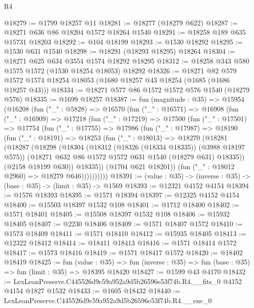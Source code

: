\begin{lexlean}{R4}
\begin{coremodule}
@18279 := @1799 @18257 @11
@18281 := @18277 (@18279 @622)
@18287 := @18271 @636 @86 @18204 @1572 @18264 @1540
@18291 := @18258 @189 @635 @15731 @18203
@18292 := @104 @18199
@18293 := @1530 @18292
@18295 := @1530 @631 @1540
@18298 := @18291 (@18293 @18295) @18264
@18304 := @18271 @625 @634 @3554 @1574 @18292 @18295
@18312 := @18258 @343 @580 @1575 @1572 (@1530 @18254 @18053) @18292
@18326 := @18271
    @82
    @579
    @1572
    @1574
    @18254
    @18053
    (@1680 @18257 @43 @18254 (@1685 (@1686 @18257 @43)))
@18334 := @18271 @577 @86 @1572 @1572 @576 @1540 (@18279 @576)
@18335 := @1699 @18257
@18387 := fun (magnitude : @35) =>
  @15954
    (@16208
      (fun ("_" : @5828) =>
      @16570
        (fun ("_" : @16571) =>
        @16908
          (fun ("_" : @16909) =>
          @17218
            (fun ("_" : @17219) =>
            @17500
              (fun ("_" : @17501) =>
              @17754
                (fun ("_" : @17755) =>
                @17986
                  (fun ("_" : @17987) =>
                  @18190
                    (fun ("_" : @18191) =>
                    @18253
                      (fun ("_" : @18013) =>
                      @18270
                        (@18281
                          (@18287
                            (@18298
                              (@18304
                                (@18312 (@18326 (@18334 @18335)) (@3988 @18197 @575))
                                (@18271 @632 @86 @1572 @1572 @631 @1540 (@18279 @631) @18335))
                              (@2158 @18199 @630))
                            @18335))
                        (@1704 @621 @18201))
                      (fun ("_" : @18012 @2960) => @18279 @646))))))))))
@18391 := (value : @35) -> (inverse : @35) -> (base : @35) -> (limit : @35) -> @1569
@18393 := @12321 @4152 @4154
@18394 := @1576 @18393
@18395 := @1571 @18394
@18397 := @12325 @4152 @4154
@18400 := @15503 @18397 @1532 @108
@18401 := @1712 @18400
@18402 := @1571 @18401
@18405 := @15508 @18397 @1532 @108
@18406 := @15932 @18405
@18407 := @2230 @18406
@18409 := @1571 @18407 @1572
@18410 := @1573 @18409
@18411 := @1571 @18410
@18412 := @15935 @18405
@18413 := @12322 @18412
@18414 := @18411 @18413
@18416 := @1571 @18414 @1572
@18417 := @1573 @18416
@18419 := @1571 @18417 @1572
@18420 := @18402 @18419
@18425 := fun (value : @35) =>
  fun (inverse : @35) => fun (base : @35) => fun (limit : @35) => @18395 @18420
@18427 := @1599 @43 @4170
@18432 := LexLeanPreserve.C445526d9c59a952a9d5b26596e53f74b.R4.__fits_0 @4152 @4154 @1827 @1532
@18433 := @1605 @18432
@18440 := LexLeanPreserve.C445526d9c59a952a9d5b26596e53f74b.R4.__enc_0

\end{coremodule}
\end{lexlean}
